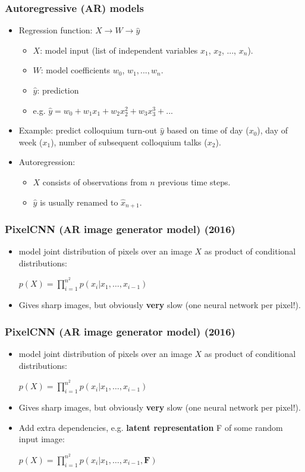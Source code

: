 \documentclass[xcolor=dvipsnames]{beamer}
\begin{document}
\begin{frame}
\frametitle{Autoregressive (AR) models}
\begin{itemize}
	\item Regression function: $X \rightarrow W \rightarrow \hat{y}$ 
		\begin{itemize}
			\item $X$: model input (list of independent variables $x_1$, $x_2$, ..., $x_n$).
			\item $W$: model coefficients $w_0$, $w_1, ..., w_n$.
			\item $\hat{y}$: prediction
			\item e.g. $\hat{y} = w_0 + w_1x_1 + w_2x_2^2 + w_3x_3^3 + ...$
		\end{itemize}
		\item Example: predict colloquium turn-out $\hat{y}$ based on time of day ($x_0$), day of week ($x_1$), number of subsequent colloquium talks ($x_2$).
	\item Autoregression:
		\begin{itemize}
			\item $X$ consists of observations from $n$ previous time steps.
			\item $\hat{y}$ is usually renamed to $\hat{x}_{n+1}$.
		\end{itemize}
\end{itemize}
\end{frame}



\begin{frame}
\frametitle{PixelCNN (AR image generator model)\cite{pixelcnn} (2016)}
\begin{itemize}
	\item model joint distribution of pixels over an image $X$ as product of conditional distributions:
	
	$p(X) = \prod_{i=1}^{n^2} p\left(x_i | x_1, \ldots , x_{i-1} \right)$
	\item Gives sharp images, but obviously \textbf{very} slow (one neural network per pixel!).
\end{itemize}
\end{frame}



\begin{frame}
\frametitle{PixelCNN (AR image generator model)\cite{pixelcnn} (2016)}
\begin{itemize}
	\item model joint distribution of pixels over an image $X$ as product of conditional distributions:
	
	$p(X) = \prod_{i=1}^{n^2} p\left(x_i | x_1, \ldots , x_{i-1}\right)$
	\item Gives sharp images, but obviously \textbf{very} slow (one neural network per pixel!).
	\item Add extra dependencies, e.g. \textbf{latent representation} F of some random input image:

	$p(X) = \prod_{i=1}^{n^2} p\left(x_i | x_1, \ldots , x_{i-1}, \mathbf{F} \right)$
\end{itemize}
\end{frame}
\end{document}
